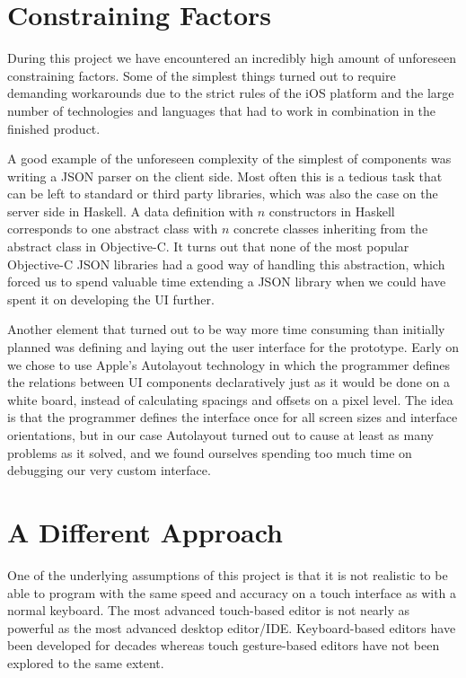 \section{Constraining Factors}
During this project we have encountered an incredibly high amount of unforeseen constraining factors. Some of the simplest things turned out to require demanding workarounds due to the strict rules of the iOS platform and the large number of technologies and languages that had to work in combination in the finished product.

A good example of the unforeseen complexity of the simplest of components was writing a JSON parser on the client side. Most often this is a tedious task that can be left to standard or third party libraries, which was also the case on the server side in Haskell. A data definition with $n$ constructors in Haskell corresponds to one abstract class with $n$ concrete classes inheriting from the abstract class in Objective-C. It turns out that none of the most popular Objective-C JSON libraries had a good way of handling this abstraction, which forced us to spend valuable time extending a JSON library when we could have spent it on developing the UI further.

Another element that turned out to be way more time consuming than initially planned was defining and laying out the user interface for the prototype. Early on we chose to use Apple's Autolayout technology in which the programmer defines the relations between UI components declaratively just as it would be done on a white board, instead of calculating spacings and offsets on a pixel level. The idea is that the programmer defines the interface once for all screen sizes and interface orientations, but in our case Autolayout turned out to cause at least as many problems as it solved, and we found ourselves spending too much time on debugging our very custom interface.

\section{A Different Approach}
One of the underlying assumptions of this project is that it is not realistic to be able to program with the same speed and accuracy on a touch interface as with a normal keyboard. The most advanced touch-based editor is not nearly as powerful as the most advanced desktop editor/IDE\@. Keyboard-based editors have been developed for decades whereas touch gesture-based editors have not been explored to the same extent. 

